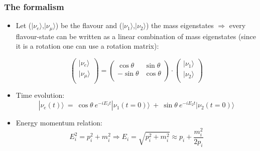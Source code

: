 \documentclass{beamer}
\begin{document}
\begin{frame}
  \frametitle{The formalism}

  \begin{itemize}
    \item Let ($|\nu_{e}\rangle$,$|\nu_{\mu}\rangle$) be the flavour and ($|\nu_1\rangle$,$|\nu_2\rangle$) the mass eigenstates $\Rightarrow$ every flavour-state can be written as a linear combination of mass eigenstates (since it is a rotation one can use a rotation matrix):

$$
\left(\begin{array}{c}
| \nu_{e} \rangle \\
| \nu_{\mu} \rangle \\
\end{array}\right)
=
\left(\begin{array}{cc}
\cos \theta & \sin \theta\\
-\sin \theta	& \cos\theta\\
\end{array}\right)
\cdot
\left(\begin{array}{c}
| \nu_{1} \rangle \\
| \nu_{2} \rangle \\
\end{array}\right)
$$
    
	\item Time evolution: $$|\nu_{e} (t) \rangle \ =\ \cos \theta  \ e^{-iE_1 t}|\nu_1 (t=0) \rangle \ + \ \sin \theta \ e^{-iE_2 t}|\nu_2 (t=0) \rangle $$

	\item Energy momentum relation: $$E_{i}^2=p_{i}^2+m_{i}^2 \Rightarrow E_{i}=\sqrt{p_{i}^2 +m_{i}^2}\approx p_{i}+\frac{m_{i}^2}{2p_{i}}$$
    

   \end{itemize}
\end{frame}
\end{document}
